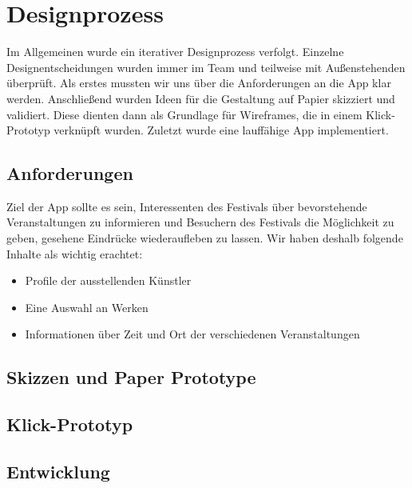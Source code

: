 \section{Designprozess}
Im Allgemeinen wurde ein iterativer Designprozess verfolgt. Einzelne Designentscheidungen wurden immer im Team und teilweise mit Außenstehenden überprüft. Als erstes mussten wir uns über die Anforderungen an die App klar werden. Anschließend wurden Ideen für die Gestaltung auf Papier skizziert und validiert. Diese dienten dann als Grundlage für Wireframes, die in einem Klick-Prototyp verknüpft wurden. Zuletzt wurde eine lauffähige App implementiert. 
\subsection{Anforderungen}
Ziel der App sollte es sein, Interessenten des Festivals über bevorstehende Veranstaltungen zu informieren und Besuchern des Festivals die Möglichkeit zu geben, gesehene Eindrücke wiederaufleben zu lassen. Wir haben deshalb folgende Inhalte als wichtig erachtet:
\begin{itemize}
\itemsep0.5pt
\item Profile der ausstellenden Künstler
\item Eine Auswahl an Werken
\item Informationen über Zeit und Ort der verschiedenen Veranstaltungen
\end{itemize}
\subsection{Skizzen und Paper Prototype}
\subsection{Klick-Prototyp}
\subsection{Entwicklung}